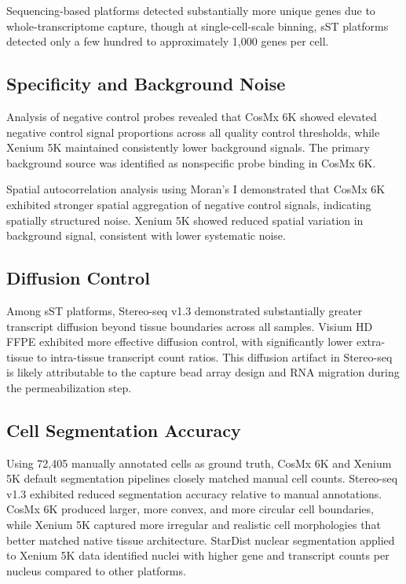 \documentclass[11pt]{article}
\begin{document}
Sequencing-based platforms detected substantially more unique genes due to whole-transcriptome capture, though at single-cell-scale binning, sST platforms detected only a few hundred to approximately 1,000 genes per cell.

\subsection{Specificity and Background Noise}

Analysis of negative control probes revealed that CosMx 6K showed elevated negative control signal proportions across all quality control thresholds, while Xenium 5K maintained consistently lower background signals. The primary background source was identified as nonspecific probe binding in CosMx 6K.

Spatial autocorrelation analysis using Moran's I demonstrated that CosMx 6K exhibited stronger spatial aggregation of negative control signals, indicating spatially structured noise. Xenium 5K showed reduced spatial variation in background signal, consistent with lower systematic noise.

\subsection{Diffusion Control}

Among sST platforms, Stereo-seq v1.3 demonstrated substantially greater transcript diffusion beyond tissue boundaries across all samples. Visium HD FFPE exhibited more effective diffusion control, with significantly lower extra-tissue to intra-tissue transcript count ratios. This diffusion artifact in Stereo-seq is likely attributable to the capture bead array design and RNA migration during the permeabilization step.

\subsection{Cell Segmentation Accuracy}

Using 72,405 manually annotated cells as ground truth, CosMx 6K and Xenium 5K default segmentation pipelines closely matched manual cell counts. Stereo-seq v1.3 exhibited reduced segmentation accuracy relative to manual annotations. CosMx 6K produced larger, more convex, and more circular cell boundaries, while Xenium 5K captured more irregular and realistic cell morphologies that better matched native tissue architecture. StarDist nuclear segmentation applied to Xenium 5K data identified nuclei with higher gene and transcript counts per nucleus compared to other platforms.
\end{document}
